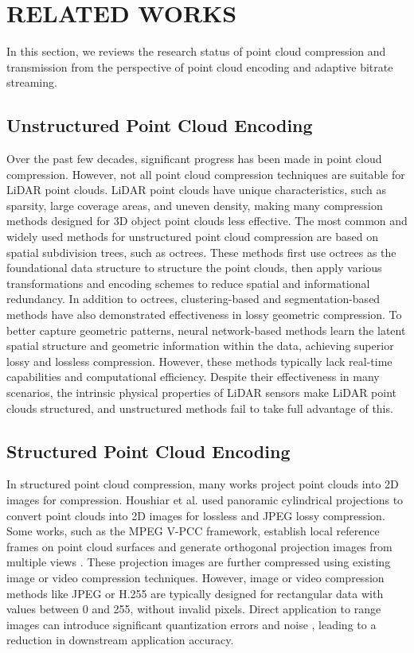 \section{RELATED WORKS}
In this section, we reviews the research status of point cloud compression and transmission from the perspective of point cloud encoding and adaptive bitrate streaming.
\subsection{Unstructured Point Cloud Encoding}
Over the past few decades, significant progress 
has been made in point cloud compression. 
However, not all point cloud compression techniques 
are suitable for LiDAR point clouds. 
LiDAR point clouds have unique characteristics, 
such as sparsity, large coverage areas, 
and uneven density, making many compression 
methods designed for 3D object point clouds less 
effective. The most common and widely used methods 
for unstructured point cloud compression are based 
on spatial subdivision trees, such as octrees. 
These methods \cite{c1}\cite{c2}\cite{c3}\cite{c4} 
first use octrees as the foundational data 
structure to structure the point clouds, 
then apply various transformations and 
encoding schemes to reduce spatial and 
informational redundancy. 
In addition to octrees, 
clustering-based and segmentation-based
 methods \cite{c6}\cite{c5} have also 
 demonstrated effectiveness in lossy geometric 
 compression. 
To better capture geometric patterns, 
neural network-based methods \cite{c7}\cite{c8} learn 
the latent spatial structure and geometric information 
within the data, achieving superior lossy and lossless 
compression. However, these methods typically 
lack real-time capabilities and computational 
efficiency. 
Despite their effectiveness in many scenarios, 
the  intrinsic physical properties of LiDAR sensors make LiDAR 
point clouds structured, 
and unstructured methods fail to 
take full advantage of this.
\subsection{Structured Point Cloud Encoding}
In structured point cloud compression, 
many works \cite{flicr} project point clouds into 2D images 
for compression. 
Houshiar et al. \cite{c14} used panoramic cylindrical 
projections to convert point clouds into 2D images 
for lossless and JPEG lossy compression. 
Some works, such as the MPEG V-PCC framework, 
establish local reference frames on point cloud 
surfaces and generate orthogonal projection images 
from multiple views \cite{c10}\cite{c11}. 
These projection images are further compressed 
using existing image or video compression techniques.
However, image or video compression methods 
like JPEG or H.255 are typically designed 
for rectangular data with values between 0 and 255, 
without invalid pixels. 
Direct application to range images can introduce 
significant quantization errors 
and noise \cite{huicheng},
 leading to a reduction in downstream 
 application accuracy.

